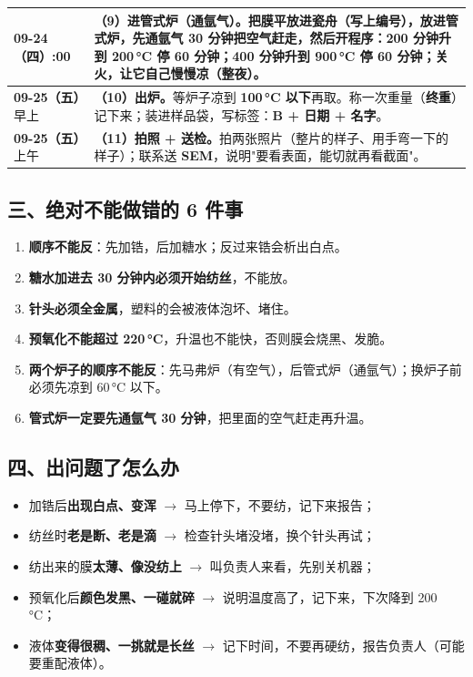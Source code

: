 \begin{table}[htbp]
\begin{tabularx}{\textwidth}{p{2.7cm} X}
\midrule
\textbf{09-24（四）}\newline 18:00 & \textbf{（9）进管式炉（通氩气）。}把膜平放进瓷舟（写上编号），放进管式炉，\textbf{先通氩气 30 分钟}把空气赶走，然后开程序：\textbf{200 分钟}升到 \textbf{200\,°C} 停 60 分钟；\textbf{400 分钟}升到 \textbf{900\,°C} 停 60 分钟；关火，让它自己慢慢凉（整夜）。\\
\midrule
\textbf{09-25（五）}\newline 早上 & \textbf{（10）出炉。}等炉子凉到 \textbf{100\,°C 以下}再取。称一次重量（\textbf{终重}）记下来；装进样品袋，写标签：\textbf{B + 日期 + 名字}。\\
\midrule
\textbf{09-25（五）}\newline 上午 & \textbf{（11）拍照 + 送检。}拍两张照片（整片的样子、用手弯一下的样子）；联系送 \textbf{SEM}，说明"要看表面，能切就再看截面"。\\
\bottomrule
\end{tabularx}
\end{table}

\subsection*{三、绝对不能做错的 6 件事}
\begin{enumerate}
  \item \textbf{顺序不能反}：先加锆，后加糖水；反过来锆会析出白点。
  \item \textbf{糖水加进去 30 分钟内必须开始纺丝}，不能放。
  \item \textbf{针头必须全金属}，塑料的会被液体泡坏、堵住。
  \item \textbf{预氧化不能超过 220\,°C}，升温也不能快，否则膜会烧黑、发脆。
  \item \textbf{两个炉子的顺序不能反}：先马弗炉（有空气），后管式炉（通氩气）；换炉子前必须先凉到 60\,°C 以下。
  \item \textbf{管式炉一定要先通氩气 30 分钟}，把里面的空气赶走再升温。
\end{enumerate}

\subsection*{四、出问题了怎么办}
\begin{itemize}
  \item 加锆后\textbf{出现白点、变浑} $\rightarrow$ 马上停下，不要纺，记下来报告；
  \item 纺丝时\textbf{老是断、老是滴} $\rightarrow$ 检查针头堵没堵，换个针头再试；
  \item 纺出来的膜\textbf{太薄、像没纺上} $\rightarrow$ 叫负责人来看，先别关机器；
  \item 预氧化后\textbf{颜色发黑、一碰就碎} $\rightarrow$ 说明温度高了，记下来，下次降到 200\,°C；
  \item 液体\textbf{变得很稠、一挑就是长丝} $\rightarrow$ 记下时间，不要再硬纺，报告负责人（可能要重配液体）。
\end{itemize}

